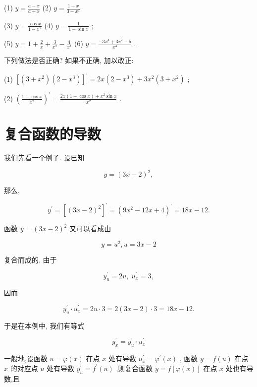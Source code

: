 \documentclass[lang=cn,newtx,10pt,scheme=chinese]{elegantbook}
\begin{document}
\begin{problemset}[练习]
(1) \(y = \frac{a - x}{a + x}\) (2) \(y = \frac{1 + x}{3 - {x}^{2}}\)

(3) \(y = \frac{\cos x}{1 - {x}^{2}}\) (4) \(y = \frac{1}{1 + \sin x}\) ;

(5) \(y = 1 + \frac{2}{x} + \frac{3}{{x}^{2}} - \frac{4}{{x}^{3}}\) (6) \(y = \frac{-3{x}^{4} + 3{x}^{2} - 5}{{x}^{3}}\) .

\item 下列做法是否正确? 如果不正确, 加以改正:

(1) \({\left\lbrack \left( 3 + {x}^{2}\right) \left( 2 - {x}^{3}\right) \right\rbrack }^{\prime } = {2x}\left( {2 - {x}^{3}}\right) + 3{x}^{2}\left( {3 + {x}^{2}}\right)\) ;

(2) \({\left( \frac{1 + \cos x}{{x}^{2}}\right) }^{\prime } = \frac{{2x}\left( {1 + \cos x}\right) + {x}^{2}\sin x}{{x}^{2}}\) .

\end{problemset}

\section{复合函数的导数}

我们先看一个例子. 设已知

\[
y = {\left( 3x - 2\right) }^{2},
\]

那么,

\[
{y}^{\prime } = {\left\lbrack {\left( 3x - 2\right) }^{2}\right\rbrack }^{\prime } = {\left( 9{x}^{2} - {12}x + 4\right) }^{\prime } = {18x} - {12}.
\]

函数 \(y = {\left( 3x - 2\right) }^{2}\) 又可以看成由

\[
y = {u}^{2},u = {3x} - 2
\]

复合而成的. 由于

\[
{y}_{u}^{\prime } = {2u},\;{u}_{x}^{\prime } = 3,
\]

因而

\[
{y}_{u}^{\prime } \cdot {u}_{x}^{\prime } = {2u} \cdot 3 = 2\left( {{3x} - 2}\right) \cdot 3 = {18x} - {12}.
\]

于是在本例中, 我们有等式

\[
{y}_{x}^{\prime } = {y}_{u}^{\prime } \cdot {u}_{x}^{\prime }
\]

一般地,设函数 \(u = \varphi \left( x\right)\) 在点 \(x\) 处有导数 \({u}_{x}^{\prime } = {\varphi }^{\prime }\left( x\right)\) , 函数 \(y = f\left( u\right)\) 在点 \(x\) 的对应点 \(u\) 处有导数 \({y}_{u}^{\prime } = {f}^{\prime }\left( u\right)\) ,则复合函数 \(y = f\left\lbrack {\varphi \left( x\right) }\right\rbrack\) 在点 \(x\) 处也有导数,且
\end{document}
